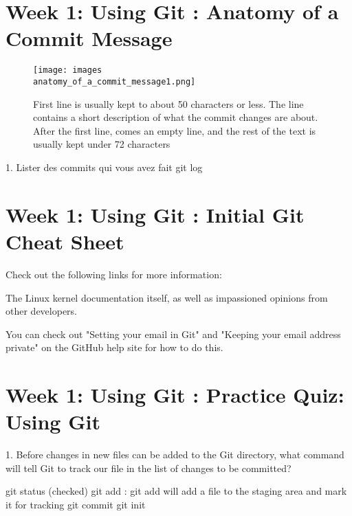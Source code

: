 \documentclass[11pt, onecolumn]{article}
\begin{document}

\section{Week 1: Using Git : Anatomy of a Commit Message}

\begin{figure}[h]
\begin{center}
\texttt{[image: images\\anatomy\_of\_a\_commit\_message1.png]}
\end{center}
\caption{First line is usually kept to about 50 characters or less. The line contains a short description of what the commit changes are about. After the first line, comes an empty line, and the rest of the text is usually kept under 72 characters}
\label{anatomy_of_a_commit_message1}
\end{figure}

1. Lister des commits qui vous avez fait 
git log



\section{Week 1: Using Git : Initial Git Cheat Sheet}

Check out the following links for more information:

The Linux kernel documentation itself, as well as impassioned opinions from other developers. 

You can check out "Setting your email in Git" and "Keeping your email address private" on the GitHub help site for how to do this. 



\section{Week 1: Using Git : Practice Quiz: Using Git}

1. Before changes in new files can be added to the Git directory, what command will tell Git to track our file in the list of changes to be committed?

git status
(checked) git add : git add will add a file to the staging area and mark it for tracking
git commit 
git init
\end{document}
